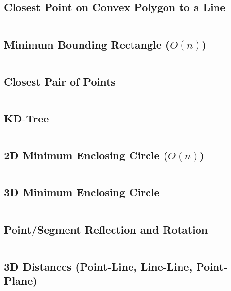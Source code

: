 \documentclass[8pt, a4paper, oneside]{extarticle}
\begin{document}
\begin{multicols*}{2}
\subsection{Closest Point on Convex Polygon to a Line}
\inputminted{c++}{codes/geometry/closest_point_to_line.cpp}

\subsection{Minimum Bounding Rectangle ($O(n)$)}
\inputminted{c++}{codes/geometry/min_bounding_rectangle.cpp}

\subsection{Closest Pair of Points}
\inputminted{c++}{codes/geometry/closest_pair.cpp}

\subsection{KD-Tree}
\inputminted{c++}{codes/geometry/kd_tree.cpp}

\subsection{2D Minimum Enclosing Circle ($O(n)$)}
\inputminted{c++}{codes/geometry/2d_minimum_enclosing_circle.cpp}

\subsection{3D Minimum Enclosing Circle}
\inputminted{c++}{codes/geometry/3d_minimum_enclosing_circle.cpp}


\subsection{Point/Segment Reflection and Rotation}
\inputminted{c++}{codes/geometry/reflect_rotate.cpp}

\subsection{3D Distances (Point-Line, Line-Line, Point-Plane)}
\inputminted{c++}{codes/geometry/distance_3d.cpp}


\end{multicols*}
\end{document}
